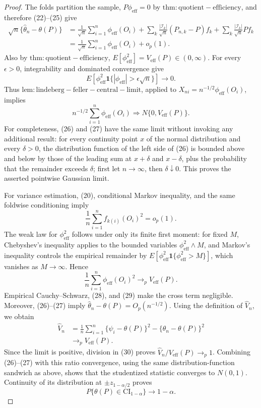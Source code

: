 \documentclass{article}
\begin{document}
\begin{proof}
The folds partition the sample, \(P\phi_{\mathrm{eff}}=0\) by \(\mathrm{thm:quotient-efficiency}\), and therefore (22)--(25) give
\[
\begin{aligned}
 \sqrt n\{\widehat\theta_n-\theta(P)\}
 &=\frac1{\sqrt n}\sum_{i=1}^n\phi_{\mathrm{eff}}(O_i)
 +\sum_k\frac{|\mathcal I_k|}{\sqrt n}(P_{n,k}-P)f_k
 +\sum_k\frac{|\mathcal I_k|}{\sqrt n}Pf_k\\
 &=\frac1{\sqrt n}\sum_{i=1}^n\phi_{\mathrm{eff}}(O_i)+o_p(1).          \tag{26}
\end{aligned}
\]
Also by \(\mathrm{thm:quotient-efficiency}\),
\(E[\phi_{\mathrm{eff}}^2]=V_{\mathrm{eff}}(P)\in(0,\infty)\).  For every \(\epsilon>0\), integrability and dominated convergence give
\[
 E[\phi_{\mathrm{eff}}^2\mathbf 1\{|\phi_{\mathrm{eff}}|>\epsilon\sqrt n\}]
 \longrightarrow0.
\]
Thus \(\mathrm{lem:lindeberg-feller-central-limit}\), applied to
\(X_{ni}=n^{-1/2}\phi_{\mathrm{eff}}(O_i)\), implies
\[
 n^{-1/2}\sum_{i=1}^n\phi_{\mathrm{eff}}(O_i)
 \Rightarrow N\{0,V_{\mathrm{eff}}(P)\}.                                  \tag{27}
\]
For completeness, (26) and (27) have the same limit without invoking any additional result: for every continuity point \(x\) of the normal distribution and every \(\delta>0\), the distribution function of the left side of (26) is bounded above and below by those of the leading sum at \(x+\delta\) and \(x-\delta\), plus the probability that the remainder exceeds \(\delta\); first let \(n\to\infty\), then \(\delta\downarrow0\).  This proves the asserted pointwise Gaussian limit.

For variance estimation, (20), conditional Markov inequality, and the same foldwise conditioning imply
\[
 \frac1n\sum_{i=1}^nf_{k(i)}(O_i)^2=o_p(1).                                \tag{28}
\]
The weak law for \(\phi_{\mathrm{eff}}^2\) follows under only its finite first moment: for fixed \(M\), Chebyshev's inequality applies to the bounded variables \(\phi_{\mathrm{eff}}^2\wedge M\), and Markov's inequality controls the empirical remainder by
\(E[\phi_{\mathrm{eff}}^2\mathbf 1\{\phi_{\mathrm{eff}}^2>M\}]\), which vanishes as \(M\to\infty\).  Hence
\[
 \frac1n\sum_{i=1}^n\phi_{\mathrm{eff}}(O_i)^2
 \longrightarrow_pV_{\mathrm{eff}}(P).                                   \tag{29}
\]
Empirical Cauchy--Schwarz, (28), and (29) make the cross term negligible.  Moreover, (26)--(27) imply \(\widehat\theta_n-\theta(P)=O_p(n^{-1/2})\).  Using the definition of \(\widehat V_n\), we obtain
\[
\begin{aligned}
 \widehat V_n
 &=\frac1n\sum_{i=1}^n\{\widehat\psi_i-\theta(P)\}^2
   -\{\widehat\theta_n-\theta(P)\}^2\\
 &\longrightarrow_pV_{\mathrm{eff}}(P).                                   \tag{30}
\end{aligned}
\]
Since the limit is positive, division in (30) proves
\(\widehat V_n/V_{\mathrm{eff}}(P)\to_p1\).  Combining (26)--(27) with this ratio convergence, using the same distribution-function sandwich as above, shows that the studentized statistic converges to \(N(0,1)\).  Continuity of its distribution at \(\pm z_{1-\alpha/2}\) proves
\[
 P\{\theta(P)\in\mathrm{CI}_{1-\alpha}\}\longrightarrow1-\alpha.
\]


\end{proof}
\end{document}
